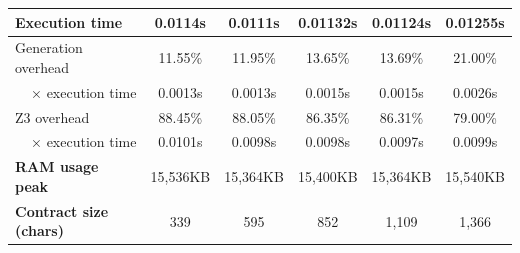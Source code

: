 \documentclass[english,runningheads]{llncs}
\begin{document}
\begin{table}[]
{\begin{tabular}{l||lllll}
\textbf{Execution time}                & \multicolumn{1}{c|}{0.0114s}  & \multicolumn{1}{c|}{0.0111s}  & \multicolumn{1}{c|}{0.01132s} & \multicolumn{1}{c|}{0.01124s} & \multicolumn{1}{c}{0.01255s} \\ \hline
Generation overhead                    & \multicolumn{1}{c|}{11.55\%}  & \multicolumn{1}{c|}{11.95\%}  & \multicolumn{1}{c|}{13.65\%}  & \multicolumn{1}{c|}{13.69\%}  & \multicolumn{1}{c}{21.00\%} \\ \hline
\multicolumn{1}{r||}{× execution time} & \multicolumn{1}{c|}{0.0013s}  & \multicolumn{1}{c|}{0.0013s}  & \multicolumn{1}{c|}{0.0015s}  & \multicolumn{1}{c|}{0.0015s}  & \multicolumn{1}{c}{0.0026s} \\ \hline
Z3 overhead                            & \multicolumn{1}{c|}{88.45\%}  & \multicolumn{1}{c|}{88.05\%}  & \multicolumn{1}{c|}{86.35\%}  & \multicolumn{1}{c|}{86.31\%}  & \multicolumn{1}{c}{79.00\%} \\ \hline
\multicolumn{1}{r||}{× execution time} & \multicolumn{1}{c|}{0.0101s}  & \multicolumn{1}{c|}{0.0098s}  & \multicolumn{1}{c|}{0.0098s}  & \multicolumn{1}{c|}{0.0097s}  & \multicolumn{1}{c}{0.0099s} \\ \hline
\textbf{RAM usage peak}                & \multicolumn{1}{c|}{15,536KB} & \multicolumn{1}{c|}{15,364KB} & \multicolumn{1}{c|}{15,400KB} & \multicolumn{1}{c|}{15,364KB} & \multicolumn{1}{c}{15,540KB} \\ \hline \hline
\textbf{Contract size (chars)}         & \multicolumn{1}{c|}{339}      & \multicolumn{1}{c|}{595}      & \multicolumn{1}{c|}{852}      & \multicolumn{1}{c|}{1,109}    & \multicolumn{1}{c}{1,366}
\end{tabular}
}
\end{table}
\end{document}
